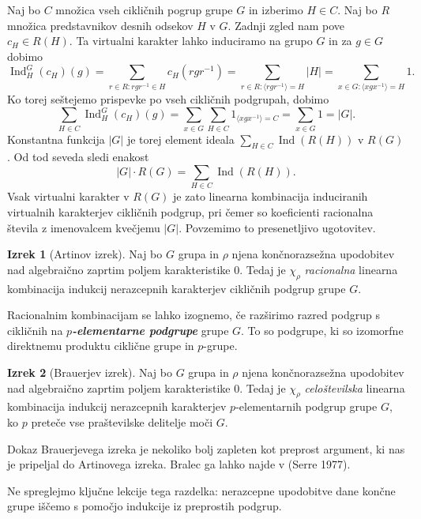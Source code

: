 \documentclass[11pt]{book}
\DeclareMathOperator\Ind{Ind}
\def\definicija{\color{rdeca}\bf\em}
\def\literatura{\color{modra}}
\theoremstyle{definition}
\theoremstyle{zgled}
\theoremstyle{odprtproblem}
\theoremstyle{domacanaloga}
\theoremstyle{izrek}
\newtheorem*{izrek}{Izrek}
\begin{document}
Naj bo $C$ množica vseh cikličnih pogrup grupe $G$ in izberimo $H \in C$. Naj bo $R$ množica predstavnikov desnih odsekov $H$ v $G$. Zadnji zgled nam pove $c_H \in R(H)$. Ta virtualni karakter lahko induciramo na grupo $G$ in za $g \in G$ dobimo
\[
    {\textstyle \Ind^G_H(c_H)(g)} = \sum_{r \in R \colon r g r^{-1} \in H} c_H(r g r^{-1}) =
    \sum_{r \in R \colon \langle r g r^{-1} \rangle = H} |H| =
    \sum_{x \in G \colon  \langle x g x^{-1} \rangle = H} 1.
\]
Ko torej seštejemo prispevke po vseh cikličnih podgrupah, dobimo
\[
  \sum_{H \in C} {\textstyle \Ind^G_H(c_H)(g)} = \sum_{x \in G} \sum_{H \in C} 1_{\langle x g x^{-1} \rangle = C} = \sum_{x \in G} 1 = |G|.  
\]
Konstantna funkcija $|G|$ je torej element ideala $\sum_{H \in C} \Ind(R(H))$ v $R(G)$. Od tod seveda sledi enakost 
\[
    |G| \cdot R(G) = \sum_{H \in C} \Ind(R(H)).
\]
Vsak virtualni karakter v $R(G)$ je zato linearna kombinacija induciranih virtualnih karakterjev cikličnih podgrup, pri čemer so koeficienti racionalna števila z imenovalcem kvečjemu $|G|$. Povzemimo to presenetljivo ugotovitev.

\begin{izrek}[Artinov izrek]
Naj bo $G$ grupa in $\rho$ njena končnorazsežna upodobitev nad algebraično zaprtim poljem karakteristike $0$. Tedaj je $\chi_{\rho}$ \emph{racionalna} linearna kombinacija indukcij nerazcepnih karakterjev cikličnih podgrup grupe $G$.
\end{izrek}

Racionalnim kombinacijam se lahko izognemo, če razširimo razred podgrup s cikličnih na {\definicija $p$-elementarne podgrupe} grupe $G$. To so podgrupe, ki so izomorfne direktnemu produktu ciklične grupe in $p$-grupe.

\begin{izrek}[Brauerjev izrek]
Naj bo $G$ grupa in $\rho$ njena končnorazsežna upodobitev nad algebraično zaprtim poljem karakteristike $0$. Tedaj je $\chi_{\rho}$ \emph{celoštevilska} linearna kombinacija indukcij nerazcepnih karakterjev $p$-elementarnih podgrup grupe $G$, ko $p$ preteče vse praštevilske delitelje moči $G$.
\end{izrek}

Dokaz Brauerjevega izreka je nekoliko bolj zapleten kot preprost argument, ki nas je pripeljal do Artinovega izreka. Bralec ga lahko najde v {\literatura (Serre 1977)}. 

Ne spreglejmo ključne lekcije tega razdelka: nerazcepne upodobitve dane končne grupe iščemo s pomočjo indukcije iz preprostih podgrup.
\end{document}
